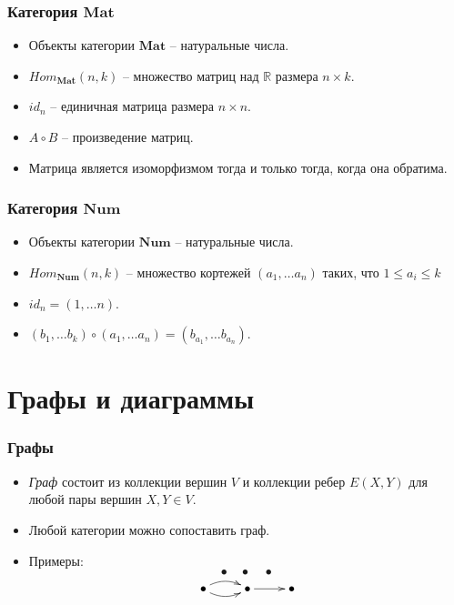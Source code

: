 \documentclass{beamer}
\newcommand{\cat}[1]{\mathbf{#1}}
\newcommand{\Mat}{\cat{Mat}}
\newcommand{\Num}{\cat{Num}}
\begin{document}
\begin{frame}
\frametitle{Категория $\Mat$}
\begin{itemize}
\item Объекты категории $\Mat$ -- натуральные числа.
\item $Hom_\Mat(n, k)$ -- множество матриц над $\mathbb{R}$ размера $n \times k$.
\item $id_n$ -- единичная матрица размера $n \times n$.
\item $A \circ B$ -- произведение матриц.
\item Матрица является изоморфизмом тогда и только тогда, когда она обратима.
\end{itemize}
\end{frame}

\begin{frame}
\frametitle{Категория $\Num$}
\begin{itemize}
\item Объекты категории $\Num$ -- натуральные числа.
\item $Hom_\Num(n, k)$ -- множество кортежей $(a_1, \ldots a_n)$ таких, что $1 \leq a_i \leq k$
\item $id_n = (1, \ldots n)$.
\item $(b_1, \ldots b_k) \circ (a_1, \ldots a_n) = (b_{a_1}, \ldots b_{a_n})$.
\end{itemize}
\end{frame}

\section{Графы и диаграммы}

\begin{frame}
\frametitle{Графы}
\begin{itemize}
\item \emph{Граф} состоит из коллекции вершин $V$ и коллекции ребер $E(X, Y)$ для любой пары вершин $X, Y \in V$.
\item Любой категории можно сопоставить граф.
\item Примеры:
\[ \bullet \quad \bullet \quad \bullet \]
\[ \xymatrix{ \bullet \ar@/^/[r] \ar@/_/[r] & \bullet \ar[r] & \bullet } \]
\end{itemize}
\end{frame}
\end{document}

